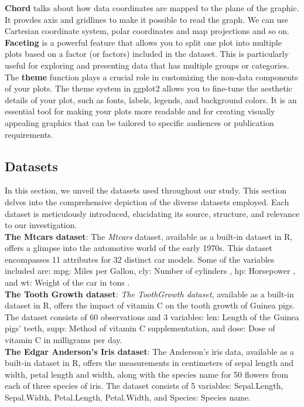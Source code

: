 \documentclass{article}\usepackage[]{graphicx}\usepackage[]{xcolor}
\begin{document}
\textbf{Chord} talks about how data coordinates are mapped to the plane of the graphic. It provdes axis and gridlines to make it possible to read the graph. We can use Cartesian coordinate system, polar coordinates and map projections and so on.\\
\textbf{Faceting} is a powerful feature that allows you to split one plot into multiple plots based on a factor (or factors) included in the dataset. This is particularly useful for exploring and presenting data that has multiple groups or categories.\\
The \textbf{theme} function plays a crucial role in customizing the non-data components of your plots. The theme system in ggplot2 allows you to fine-tune the aesthetic details of your plot, such as fonts, labels, legends, and background colors. It is an essential tool for making your plots more readable and for creating visually appealing graphics that can be tailored to specific audiences or publication requirements.

\subsection{Datasets}
In this section, we unveil the datasets used throughout our study. This section delves into the comprehensive depiction of the diverse datasets employed. Each dataset is meticulously introduced, elucidating its source, structure, and relevance to our investigation.\\

\noindent
\textbf{The Mtcars dataset}: The \textit{Mtcars} dataset, available as a built-in dataset in R, offers a glimpse into the automotive world of the early 1970s. This dataset encompasses 11 attributes for 32 distinct car models. Some of the variables included are: mpg: Miles per Gallon, cly: Number of cylinders , hp: Horsepower , and wt: Weight of the car in tons .\\

\noindent
\textbf{The Tooth Growth dataset}: \textit{The ToothGrowth dataset}, available as a built-in dataset in R, offers the impact of vitamin C on the tooth growth of Guinea pigs. The dataset consists of 60 observations and 3 variables: len: Length of the Guinea pigs' teeth, supp: Method of vitamin C supplementation, and dose: Dose of vitamin C in milligrams per day.\\

\noindent
\textbf{The Edgar Anderson's Iris dataset}: The Anderson's iris data, available as a built-in dataset in R, offers the measurements in centimeters of sepal length and width, petal length and width, along with the species name for 50 flowers from each of three species of iris. The dataset consists of 5 variables: Sepal.Length, Sepal.Width, Petal.Length, Petal.Width, and Species: Species name.\\
\end{document}
